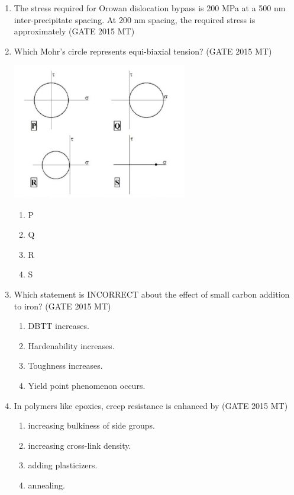 \documentclass[12pt]{article}
\begin{document}
\begin{enumerate}
\item  The stress required for Orowan dislocation bypass is 200 MPa at a 500 nm inter-precipitate spacing. At 200 nm spacing, the required stress is approximately (GATE 2015 MT)


\item  Which Mohr's circle represents equi-biaxial tension? (GATE 2015 MT)
\begin{center}
  \includegraphics[width=0.6\textwidth]{images/q33i.jpg}
\end{center}
\begin{enumerate}[label=(\alph*)]
  \item P
  \item Q
  \item R
  \item S
\end{enumerate}

\item  Which statement is INCORRECT about the effect of small carbon addition to iron? (GATE 2015 MT)
\begin{enumerate}[label=(\alph*)]
  \item DBTT increases.
  \item Hardenability increases.
  \item Toughness increases.
  \item Yield point phenomenon occurs.
\end{enumerate}

\item  In polymers like epoxies, creep resistance is enhanced by (GATE 2015 MT)
\begin{enumerate}[label=(\alph*)]
  \item increasing bulkiness of side groups.
  \item increasing cross-link density.
  \item adding plasticizers.
  \item annealing.
\end{enumerate}












\end{enumerate}
\end{document}
